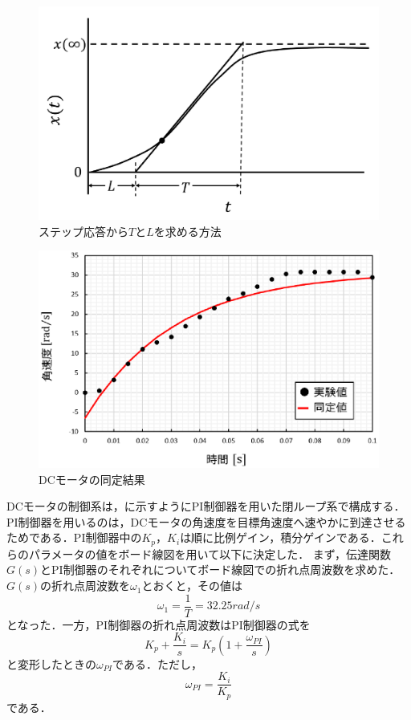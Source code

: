 \begin{figure}[htb]
  \centering
    \includegraphics[width=0.7\hsize]{picture/eps/step_doutei.eps}
  \caption{ステップ応答から$T$と$L$を求める方法}
  \label{fig::step_doutei}
  
\end{figure}

\begin{figure}[htb]
  \centering
    \includegraphics[width=0.7\hsize]{picture/eps/dcmotor_doutei.eps}
  \caption{DCモータの同定結果}
  \label{fig::dcmotor_doutei}
  
\end{figure}

  
  DCモータの制御系は，に示すようにPI制御器を用いた閉ループ系で構成する．PI制御器を用いるのは，DCモータの角速度を目標角速度へ速やかに到達させるためである．PI制御器中の$K_{p}$，$K_{i}$は順に比例ゲイン，積分ゲインである．これらのパラメータの値をボード線図を用いて以下に決定した．
  まず，伝達関数$G(s)$とPI制御器のそれぞれについてボード線図での折れ点周波数を求めた．$G(s)$の折れ点周波数を$\omega_{1}$とおくと，その値は  
\begin{equation}
 \omega_{1}=\frac{1}{T}=32.25\unit{rad/s}
\end{equation}
となった．一方，PI制御器の折れ点周波数はPI制御器の式を
\begin{equation}
 K_{p}+\frac{K_{i}}{s}=K_{p}(1+\frac{\omega_{PI}}{s})
\end{equation}
と変形したときの$\omega_{PI}$である．ただし，
\begin{equation}
 \omega_{PI}=\frac{K_{i}}{K_{p}}\label{eq::omega_PI}
\end{equation}
である．

